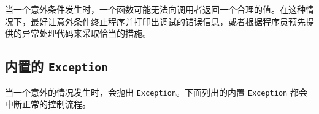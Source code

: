 当一个意外条件发生时，一个函数可能无法向调用者返回一个合理的值。在这种情况下，最好让意外条件终止程序并打印出调试的错误信息，或者根据程序员预先提供的异常处理代码来采取恰当的措施。



\hypertarget{18218681852389631555}{}


\subsection{内置的 \texttt{Exception}}



当一个意外的情况发生时，会抛出 \texttt{Exception}。下面列出的内置 \texttt{Exception} 都会中断正常的控制流程。




\begin{table}[h]


\end{table}

